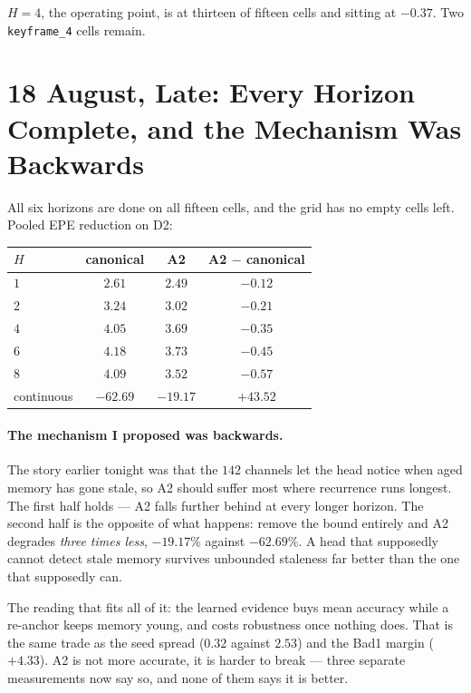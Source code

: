 \documentclass[11pt,a4paper]{article}
\begin{document}
$H{=}4$, the operating point, is at thirteen of fifteen cells and sitting at
$-0.37$. Two \texttt{keyframe\_4} cells remain.


\section*{18 August, Late: Every Horizon Complete, and the Mechanism Was Backwards}

All six horizons are done on all fifteen cells, and the grid has no empty cells
left. Pooled EPE reduction on D2:

\begin{center}
\begin{tabular}{lccc}
\toprule
$H$ & canonical & A2 & A2 $-$ canonical \\
\midrule
$1$ & $2.61$ & $2.49$ & $-0.12$ \\
$2$ & $3.24$ & $3.02$ & $-0.21$ \\
$4$ & $4.05$ & $3.69$ & $-0.35$ \\
$6$ & $4.18$ & $3.73$ & $-0.45$ \\
$8$ & $4.09$ & $3.52$ & $-0.57$ \\
continuous & $-62.69$ & $-19.17$ & $+43.52$ \\
\bottomrule
\end{tabular}
\end{center}

\paragraph{The mechanism I proposed was backwards.} The story earlier tonight was
that the $142$ channels let the head notice when aged memory has gone stale, so
A2 should suffer most where recurrence runs longest. The first half holds --- A2
falls further behind at every longer horizon. The second half is the opposite of
what happens: remove the bound entirely and A2 degrades \emph{three times less},
$-19.17\%$ against $-62.69\%$. A head that supposedly cannot detect stale memory
survives unbounded staleness far better than the one that supposedly can.

The reading that fits all of it: the learned evidence buys mean accuracy while a
re-anchor keeps memory young, and costs robustness once nothing does. That is the
same trade as the seed spread ($0.32$ against $2.53$) and the Bad1 margin
($+4.33$). A2 is not more accurate, it is harder to break --- three separate
measurements now say so, and none of them says it is better.
\end{document}
